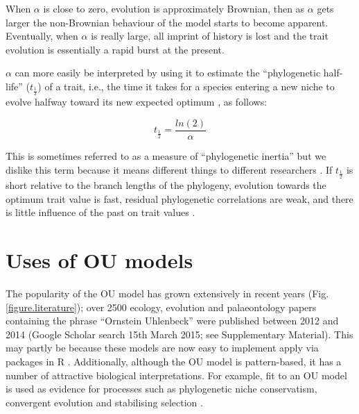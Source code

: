 \documentclass[a4paper,12pt]{article}
\begin{document}
    When $\alpha$ is close to zero, evolution is approximately Brownian, then as $\alpha$ gets larger the non-Brownian behaviour of the model starts to become apparent. 
    Eventually, when $\alpha$ is really large, all imprint of history is lost and the trait evolution is essentially a rapid burst at the present.

    $\alpha$ can more easily be interpreted by using it to estimate the ``phylogenetic half-life'' ($t_\frac{1}{2}$) of a trait, i.e., the time it takes for a species entering a new niche to evolve halfway toward its new expected optimum \citep{hansen1997stabilizing}, as follows:

      \begin{equation}
        t_\frac{1}{2} = \frac{ln(2)}{\alpha}
        \label{equation:halflife}
      \end{equation}
    
    \noindent
    This is sometimes referred to as a measure of ``phylogenetic inertia'' but we dislike this term because it means different things to different researchers \citep{Losos:2008aa}.
    If $t_\frac{1}{2}$ is short relative to the branch lengths of the phylogeny, evolution towards the optimum trait value is fast, residual phylogenetic correlations are weak, and there is little influence of the past on trait values \citep{hansen1997stabilizing}. 
  
  \section{Uses of OU models}
  The popularity of the OU model has grown extensively in recent years (Fig. \ref{figure.literature}); over 2500 ecology, evolution and palaeontology papers containing the phrase ``Ornstein Uhlenbeck'' were published between 2012 and 2014 (Google Scholar search 15th March 2015; see Supplementary Material). %
  This may partly be because these models are now easy to implement apply via packages in R \citep[e.g. ouch, GEIGER and OUwie;][]{Butler:2004aa,Harmon:2008aa,beaulieu2012ouwie}. 
  Additionally, although the OU model is pattern-based, it has a number of attractive biological interpretations. 
  For example, fit to an OU model is used as evidence for processes such as phylogenetic niche conservatism, convergent evolution and stabilising selection \citep[e.g.,][]{Wiens:2010aa,christin2013anatomical,ingram2013surface}. 
   
\end{document}
